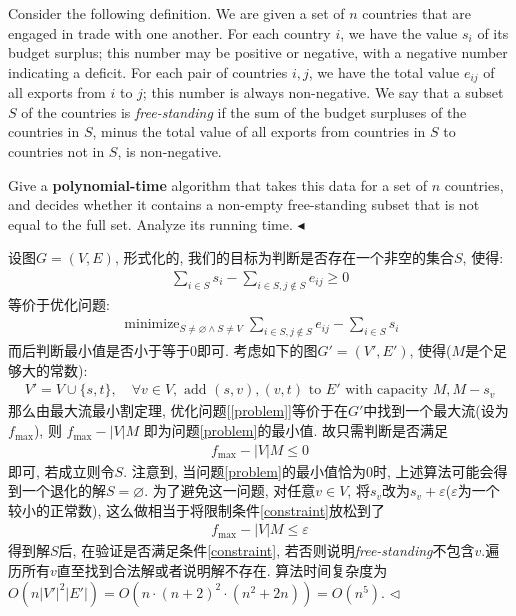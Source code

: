 \documentclass[11pt]{article}
\newenvironment{problem}[2][Problem]{\begin{trivlist}
    \item[\hskip \labelsep{\bfseries#1}\hskip\labelsep{\bfseries#2.}]\mbox{}\newline}{\hfill$\blacktriangleleft$\end{trivlist}}
\newenvironment{answer}[1][Answer]{\begin{trivlist}
\item[\hskip \labelsep{\bfseries\itshape#1.}\hskip \labelsep]}{\hfill$\lhd$\end{trivlist}}
\DeclareMathOperator*{\minimize}{minimize}
\begin{document}
\begin{problem}{2. (Trade Surplus)}
Consider the following definition. We are given a set of $n$ countries that are engaged in trade with one another. For each country $i$, we have the value $s_i$ of its budget surplus; this number may be positive or negative, with a negative number indicating a deficit. For each pair of countries $i, j$, we have the total value $e_{ij}$ of all exports from $i$ to $j$; this number is always non-negative. We say that a subset $S$ of the countries is \textit{free-standing} if the sum of the budget surpluses of the countries in $S$, minus the total value of all exports from countries in $S$ to countries not in $S$, is non-negative.

Give a \textbf{polynomial-time} algorithm that takes this data for a set of $n$ countries, and decides whether it contains a non-empty free-standing subset that is not equal to the full set. Analyze its running time.
\end{problem}
\begin{answer}
    设图$G = (V,E)$, 形式化的, 我们的目标为判断是否存在一个非空的集合$S$, 使得:
    \begin{align}
        \sum_{i\in S} s_i - \sum_{i\in S, j\not\in S} e_{ij} \ge 0
    \end{align}
    等价于优化问题:
    \begin{align}
        \label{problem}
        \minimize_{S \neq \varnothing\land S \neq V} \sum_{i \in S, j\not\in S} e_{ij} - \sum_{i\in S} s_i
    \end{align}
    而后判断最小值是否小于等于0即可. 考虑如下的图$G' = (V', E')$, 使得($M$是个足够大的常数):
    \begin{align*}
        V' = V \cup \{s,t\}, \quad \forall v \in V, \text{ add } (s,v),(v,t) \text{ to } E' \text{ with capacity } M,M-s_v 
    \end{align*}
    那么由最大流最小割定理, 优化问题[\ref{problem}]等价于在$G'$中找到一个最大流(设为$f_{\max}$), 则
    $f_{\max} - |V|M$
    即为问题\eqref{problem}的最小值. 故只需判断是否满足
    \begin{align}
        \label{constraint}
        f_{\max} - |V|M\le 0
    \end{align}即可, 若成立则令$S$. 注意到, 当问题\eqref{problem}的最小值恰为0时, 上述算法可能会得到一个退化的解$S = \varnothing$. 
    为了避免这一问题, 对任意$v\in V$, 将$s_v$改为$s_v + \varepsilon$($\varepsilon$为一个较小的正常数), 这么做相当于将限制条件\eqref{constraint}放松到了
    \begin{align}
        f_{\max} - |V|M \le \varepsilon
    \end{align}
    得到解$S$后, 在验证是否满足条件\eqref{constraint}, 若否则说明\textit{free-standing}不包含$v$.遍历所有$v$直至找到合法解或者说明解不存在.
    算法时间复杂度为$O(n |V'|^2|E'|) = O(n\cdot (n+2)^2\cdot (n^2+2n)) = O(n^5)$.
\end{answer}
\end{document}
